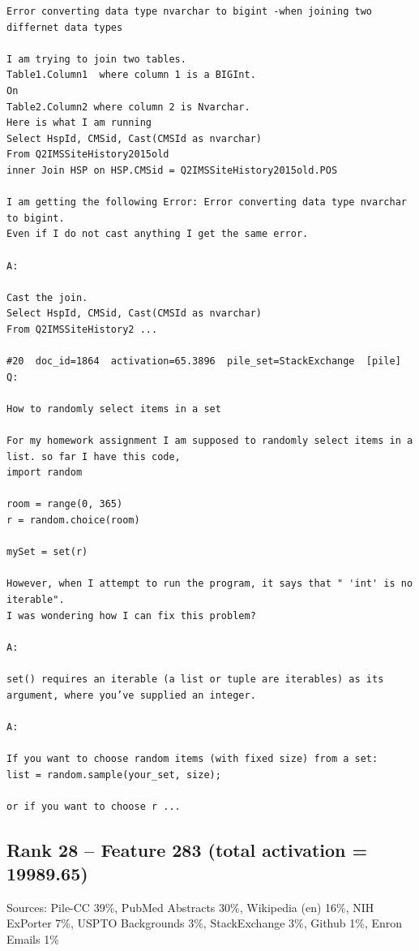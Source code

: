 \begin{verbatim}
Error converting data type nvarchar to bigint -when joining two differnet data types

I am trying to join two tables.  
Table1.Column1  where column 1 is a BIGInt. 
On
Table2.Column2 where column 2 is Nvarchar.  
Here is what I am running 
Select HspId, CMSid, Cast(CMSId as nvarchar)
From Q2IMSSiteHistory2015old
inner Join HSP on HSP.CMSid = Q2IMSSiteHistory2015old.POS

I am getting the following Error: Error converting data type nvarchar to bigint.
Even if I do not cast anything I get the same error.  

A:

Cast the join.
Select HspId, CMSid, Cast(CMSId as nvarchar)
From Q2IMSSiteHistory2 ...

#20  doc_id=1864  activation=65.3896  pile_set=StackExchange  [pile]
Q:

How to randomly select items in a set

For my homework assignment I am supposed to randomly select items in a list. so far I have this code,
import random

room = range(0, 365)
r = random.choice(room)

mySet = set(r)

However, when I attempt to run the program, it says that " 'int' is no iterable". 
I was wondering how I can fix this problem? 

A:

set() requires an iterable (a list or tuple are iterables) as its argument, where you’ve supplied an integer.

A:

If you want to choose random items (with fixed size) from a set:
list = random.sample(your_set, size);

or if you want to choose r ...

\end{verbatim}

\subsection*{Rank 28 -- Feature 283 (total activation = 19989.65)}

Sources: Pile-CC 39\%, PubMed Abstracts 30\%, Wikipedia (en) 16\%, NIH ExPorter 7\%, USPTO Backgrounds 3\%, StackExchange 3\%, Github 1\%, Enron Emails 1\%

